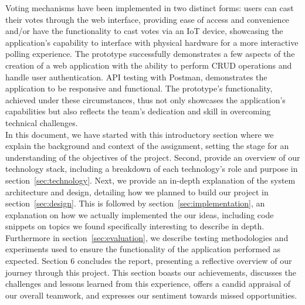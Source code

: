 \noindent Voting mechanisms have been implemented in two distinct forms: users can cast their votes through the web interface, providing ease of access and convenience and/or  have the functionality to cast votes via an IoT device, showcasing the application's capability to interface with physical hardware for a more interactive polling experience.  The prototype successfully demonstrates a few aspects of the creation of a web application with the ability to perform CRUD operations and handle user authentication.  API testing with Postman, demonstrates the application to be responsive and functional. The prototype's functionality, achieved under these circumstances, thus not only showcases the application's capabilities but also reflects the team's dedication and skill in overcoming technical challenges.\\



\noindent In this document, we have started with this introductory section where we explain the background and context of the assignment, setting the stage for an understanding of the objectives of the project.  Second, provide an overview of our technology stack, including a breakdown of each technology's role and purpose in section~\ref{sec:technology}.  Next, we provide an in-depth explanation of the system architecture and design, detailing how we planned to build our project in section~\ref{sec:design}.  This is followed by section~\ref{sec:implementation}, an explanation on how we actually implemented the our ideas, including code snippets on topics we found specifically interesting to describe in depth.  Furthermore in section~\ref{sec:evaluation}, we describe testing methodologies and experiments used to ensure the functionality of the application performed as expected.  Section 6 concludes the report, presenting a reflective overview of our journey through this project. This section boasts our achievements, discusses the challenges and lessons learned from this experience, offers a candid appraisal of our overall teamwork, and expresses our sentiment towards missed opportunities.

